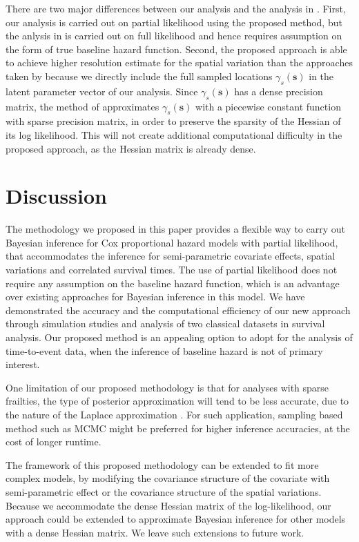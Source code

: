 \documentclass[ba]{imsart}
\begin{document}
There are two major differences between our analysis and the analysis in \cite{inlacoxph}. First, our analysis is carried out on partial likelihood using the proposed method, but the anlysis in \cite{inlacoxph} is carried out on full likelihood and hence requires assumption on the form of true baseline hazard function. Second, the proposed approach is able to achieve higher resolution estimate for the spatial variation than the approaches taken by \cite{inlacoxph} because we directly include the full sampled locations $\gamma_s(\boldsymbol{s})$ in the latent parameter vector of our analysis. Since $\gamma_s(\boldsymbol{s})$ has a dense precision matrix, the method of \cite{inlacoxph} approximates $\gamma_s(\boldsymbol{s})$ with a piecewise constant function with sparse precision matrix, in order to preserve the sparsity of the Hessian of its log likelihood. This will not create additional computational difficulty in the proposed approach, as the Hessian matrix is already dense.


\section{Discussion}\label{sec:discussion}


The methodology we proposed in this paper provides a flexible way to carry out Bayesian inference for Cox proportional hazard models with partial likelihood, that accommodates the inference for semi-parametric covariate effects, spatial variations and correlated survival times. The use of partial likelihood does not require any assumption on the baseline hazard function, which is an advantage over existing approaches for Bayesian inference in this model. We have demonstrated the accuracy and the computational efficiency of our new approach through simulation studies and analysis of two classical datasets in survival analysis. Our proposed method is an appealing option to adopt for the analysis of time-to-event data, when the inference of baseline hazard is not of primary interest.

One limitation of our proposed methodology is that for analyses with sparse frailties, the type of posterior approximation will tend to be less accurate, due to the nature of the Laplace approximation \citep{Ogden2013ASR}. For such application, sampling based method such as MCMC might be preferred for higher inference accuracies, at the cost of longer runtime. 

The framework of this proposed methodology can be extended to fit more complex models, by modifying the covariance structure of the covariate with semi-parametric effect or the covariance structure of the spatial variations. Because we accommodate the dense Hessian matrix of the log-likelihood, our approach could be extended to approximate Bayesian inference for other models with a dense Hessian matrix. We leave such extensions to future work.
\end{document}
